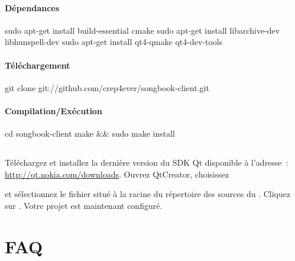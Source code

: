 \paragraph{Dépendances}

\begin{unix}
  sudo apt-get install build-essential cmake 
  sudo apt-get install libarchive-dev libhunspell-dev
  sudo apt-get install qt4-qmake qt4-dev-tools
\end{unix}

\paragraph{Téléchargement}

\begin{unix}
  git clone git://github.com/crep4ever/songbook-client.git
\end{unix}

\paragraph{Compilation/Exécution}

\begin{unix}
  cd songbook-client
  make && sudo make install
\end{unix}

\subsection{\windows}

Téléchargez et installez la dernière version du SDK Qt disponible à
l'adresse~: \url{http://qt.nokia.com/downloads}. Ouvrez QtCreator,
choisissez 
\begin{center}
\end{center}
et sélectionnez le fichier  situé à la racine du
répertoire des sources du \client{}. Cliquez sur . Votre projet \client{} est maintenant configuré.


\section{FAQ}

